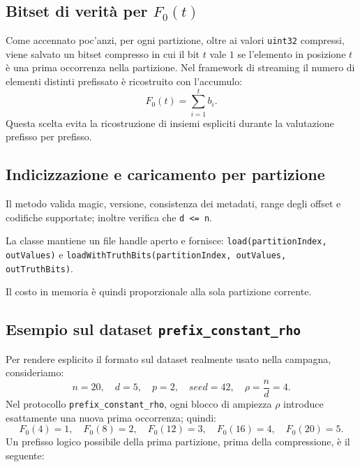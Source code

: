 \subsection{Bitset di verità per \texorpdfstring{$F_0(t)$}{F0(t)}}

Come accennato poc'anzi, per ogni partizione, oltre ai valori \texttt{uint32} compressi, viene salvato
un bitset compresso in cui il bit \(t\) vale \(1\) se
l'elemento in posizione \(t\) è una prima occorrenza nella partizione.
Nel framework di streaming il numero di elementi distinti prefissato è ricostruito con l'accumulo:
\[
F_0(t)=\sum_{i=1}^{t} b_i.
\]
Questa scelta evita la ricostruzione di insiemi espliciti durante
la valutazione prefisso per prefisso.

\subsection{Indicizzazione e caricamento per partizione}

Il metodo  valida magic, versione, consistenza dei metadati,
range degli offset e codifiche supportate; inoltre verifica che \texttt{d <= n}.

La classe  mantiene un file handle aperto e fornisce:
\texttt{load(partitionIndex, outValues)} e
\texttt{loadWithTruthBits(partitionIndex, outValues, outTruthBits)}.

Il costo in memoria è quindi proporzionale alla sola partizione corrente.

\subsection{Esempio sul dataset \texttt{prefix\_constant\_rho}}

Per rendere esplicito il formato sul dataset realmente usato nella campagna,
consideriamo:
\[
n=20,\quad d=5,\quad p=2,\quad seed=42,\quad \rho=\frac{n}{d}=4.
\]
Nel protocollo \texttt{prefix\_constant\_rho}, ogni blocco di ampiezza \(\rho\)
introduce esattamente una nuova prima occorrenza; quindi:
\[
F_0(4)=1,\quad F_0(8)=2,\quad F_0(12)=3,\quad F_0(16)=4,\quad F_0(20)=5.
\]
Un prefisso logico possibile della prima partizione, prima della compressione,
è il seguente:

